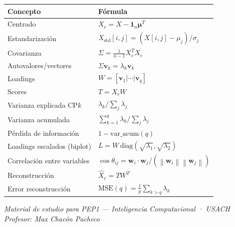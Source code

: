 \documentclass[11pt,a4paper]{article}
\newcommand{\norm}[1]{\left\lVert#1\right\rVert}
\begin{document}
\begin{center}
\renewcommand{\arraystretch}{1.5}
\begin{tabular}{@{}p{}p{}@{}}
\toprule
\textbf{Concepto} & \textbf{Fórmula} \\
\midrule
Centrado & $X_c = X - \mathbf{1}_n\bm{\mu}^{T}$ \\
Estandarización & $X_{\text{std}}[i,j] = (X[i,j]-\mu_j)/\sigma_j$ \\
Covarianza & $\Sigma = \frac{1}{n-1}X_c^{T}X_c$ \\
Autovalores/vectores & $\Sigma\mathbf{v}_k = \lambda_k \mathbf{v}_k$ \\
Loadings & $W = [\mathbf{v}_1|\cdots|\mathbf{v}_q]$ \\
Scores & $T = X_c W$ \\
Varianza explicada CP$k$ & $\lambda_k / \sum_j \lambda_j$ \\
Varianza acumulada & $\sum_{k=1}^{q}\lambda_k / \sum_j \lambda_j$ \\
Pérdida de información & $1 - \mathrm{var\_acum}(q)$ \\
Loadings escalados (biplot) & $L = W\,\mathrm{diag}(\sqrt{\lambda_1},\sqrt{\lambda_2})$ \\
Correlación entre variables & $\cos\theta_{ij} = \mathbf{w}_i\cdot\mathbf{w}_j / (\norm{\mathbf{w}_i}\norm{\mathbf{w}_j})$ \\
Reconstrucción & $\widehat{X}_c = TW^{T}$ \\
Error reconstrucción & $\mathrm{MSE}(q) = \frac{1}{p}\sum_{k>q}\lambda_k$ \\
\bottomrule
\end{tabular}
\end{center}

\vfill
\begin{center}
\textit{Material de estudio para PEP1 — Inteligencia Computacional · USACH}\\
\textit{Profesor: Max Chacón Pacheco}
\end{center}
\end{document}

